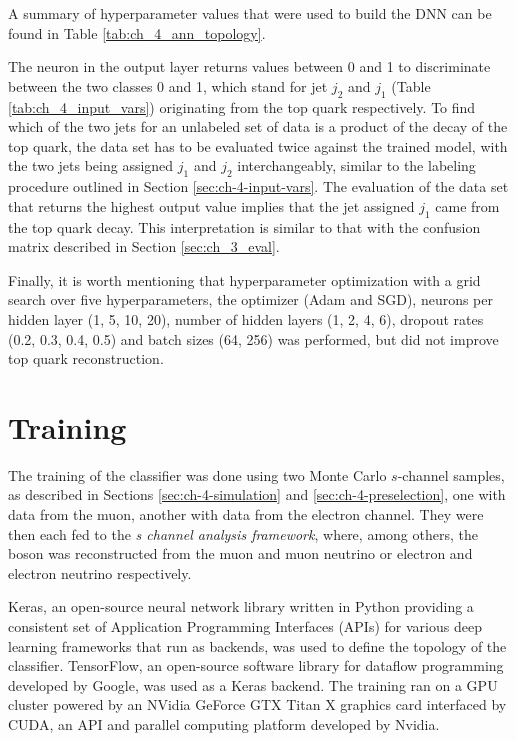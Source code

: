 A summary of hyperparameter values that were used to build the DNN can be found in Table \ref{tab:ch_4_ann_topology}.

The neuron in the output layer returns values between 0 and 1 to discriminate between the two classes 0 and 1, which stand for jet $j_2$ and $j_1$ (Table \ref{tab:ch_4_input_vars}) originating from the top quark respectively. To find which of the two jets for an unlabeled set of data is a product of the decay of the top quark, the data set has to be evaluated twice against the trained model, with the two jets being assigned $j_1$ and $j_2$ interchangeably, similar to the labeling procedure outlined in Section \ref{sec:ch-4-input-vars}. The evaluation of the data set that returns the highest output value implies that the jet assigned $j_1$ came from the top quark decay. This interpretation is similar to that with the confusion matrix described in Section \ref{sec:ch_3_eval}.

Finally, it is worth mentioning that hyperparameter optimization with a grid search over five hyperparameters, the optimizer (Adam and SGD), neurons per hidden layer (1, 5, 10, 20), number of hidden layers (1, 2, 4, 6), dropout rates (0.2, 0.3, 0.4, 0.5) and batch sizes (64, 256) was performed, but did not improve top quark reconstruction.

\section{Training}
\label{sec:ch-4-training}
The training of the classifier was done using two Monte Carlo $s$-channel samples, as described in Sections \ref{sec:ch-4-simulation} and \ref{sec:ch-4-preselection}, one with data from the muon, another with data from the electron channel. They were then each fed to the \emph{s channel analysis framework}, where, among others, the \PW boson was reconstructed from the muon and muon neutrino or electron and electron neutrino respectively.

Keras, an open-source neural network library written in Python providing a consistent set of Application Programming Interfaces (APIs) for various deep learning frameworks that run as backends, was used to define the topology of the classifier. TensorFlow, an open-source software library for dataflow programming developed by Google, was used as a Keras backend. The training ran on a GPU cluster powered by an NVidia GeForce GTX Titan X \cite{misc:geforce} graphics card interfaced by CUDA, an API and parallel computing platform developed by Nvidia.

